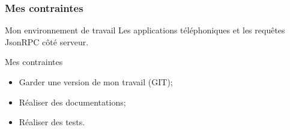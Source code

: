 \begin{frame}
	\frametitle{Mes contraintes}

	\begin{block}{Mon environnement de travail}
		Les applications téléphoniques et les requêtes JsonRPC côté serveur.
	\end{block}

	\begin{block}{Mes contraintes}
	 \begin{itemize}
	  \item Garder une version de mon travail (GIT);
      \item Réaliser des documentations;
	  \item Réaliser des tests.
	 \end{itemize}
	\end{block}

\end{frame}

